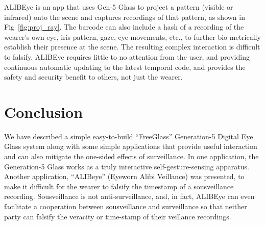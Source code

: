 ALIBEye is an app that uses Gen-5 Glass to project a pattern (visible or
infrared) onto the scene and captures recordings of
that pattern, as shown in Fig~\ref{fig:proj_ray}.
The barcode can also include a hash of a recording of the wearer's own
eye, iris pattern, gaze, eye movements, etc., to further bio-metrically
establish their presence at the scene.
The resulting complex interaction is difficult to falsify.
ALIBEye requires little to no attention from the user, and
providing continuous automatic updating to the latest temporal code,
and provides the safety and security benefit to others, not just the wearer.


%
%
%


\section{Conclusion}
We have described a simple easy-to-build ``FreeGlass'' Generation-5
Digital Eye Glass system along with
some simple applications that provide useful interaction and can also
mitigate the one-sided
effects of surveillance.  In one application, the Generation-5 Glass works as
a truly interactive self-gesture-sensing apparatus.  Another application,
``ALIBeye'' (Eyeworn Alibi Veillance) was presented, to make it
difficult for the wearer to falsify the timestamp of a sousveillance
recording.  Sousveillance is not anti-surveillance, and, in fact,
ALIBEye can even facilitate a cooperation between sousveillance and
surveillance so that neither party can falsify
the veracity or time-stamp of their veillance recordings.
